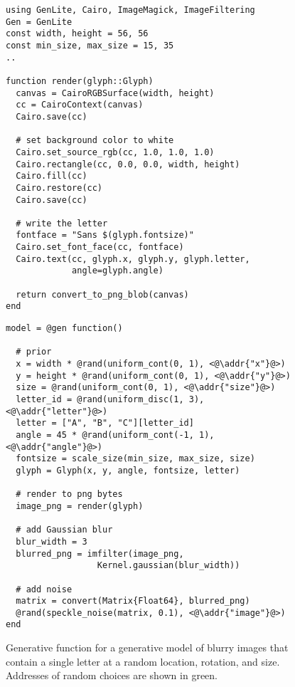 \begin{figure}[t]
\begin{minipage}[t]{0.5\textwidth}
\begin{lstlisting}
using GenLite, Cairo, ImageMagick, ImageFiltering
Gen = GenLite
const width, height = 56, 56
const min_size, max_size = 15, 35
..

function render(glyph::Glyph)
  canvas = CairoRGBSurface(width, height)
  cc = CairoContext(canvas)
  Cairo.save(cc)

  # set background color to white
  Cairo.set_source_rgb(cc, 1.0, 1.0, 1.0)
  Cairo.rectangle(cc, 0.0, 0.0, width, height)
  Cairo.fill(cc)
  Cairo.restore(cc)
  Cairo.save(cc)

  # write the letter
  fontface = "Sans $(glyph.fontsize)"
  Cairo.set_font_face(cc, fontface)
  Cairo.text(cc, glyph.x, glyph.y, glyph.letter,
             angle=glyph.angle)

  return convert_to_png_blob(canvas)
end
\end{lstlisting}
\end{minipage}%
\begin{minipage}[t]{0.5\textwidth}
\begin{lstlisting}
model = @gen function()

  # prior
  x = width * @rand(uniform_cont(0, 1), <@\addr{"x"}@>)
  y = height * @rand(uniform_cont(0, 1), <@\addr{"y"}@>)
  size = @rand(uniform_cont(0, 1), <@\addr{"size"}@>)
  letter_id = @rand(uniform_disc(1, 3), <@\addr{"letter"}@>)
  letter = ["A", "B", "C"][letter_id]
  angle = 45 * @rand(uniform_cont(-1, 1), <@\addr{"angle"}@>)
  fontsize = scale_size(min_size, max_size, size)
  glyph = Glyph(x, y, angle, fontsize, letter)

  # render to png bytes
  image_png = render(glyph)

  # add Gaussian blur
  blur_width = 3
  blurred_png = imfilter(image_png,
                  Kernel.gaussian(blur_width))

  # add noise
  matrix = convert(Matrix{Float64}, blurred_png)
  @rand(speckle_noise(matrix, 0.1), <@\addr{"image"}@>)
end
\end{lstlisting}
\end{minipage}
\caption{Generative function for a generative model of blurry images that contain a single letter at a random location, rotation, and size. Addresses of random choices are shown in green.}
\label{fig:model-code-figure}
\end{figure}
